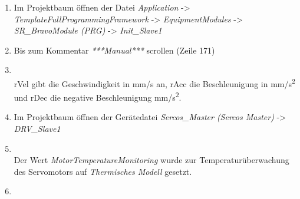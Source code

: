 \documentclass[../../../Bachelorarbeit.tex]{subfiles}
\begin{document}
\begin{enumerate}
    \item Im Projektbaum öffnen der Datei \textit{Application} -> \textit{TemplateFullProgrammingFramework} -> \textit{EquipmentModules} -> \textit{SR\_BravoModule (PRG)} -> \textit{Init\_Slave1}
    \item Bis zum Kommentar \textit{***Manual***} scrollen (Zeile 171)
    \item \begin{minipage}[t]{\linewidth}
        \raggedright
        \label{fig:my-img34}
    \end{minipage}
    \bigskip \\
    rVel gibt die Geschwindigkeit in \si{mm/s} an, rAcc die Beschleunigung in \si{mm/s^2} und rDec die negative Beschleunigung \si{mm/s^2}.
    \item Im Projektbaum öffnen der Gerätedatei \textit{Sercos\_Master (Sercos Master)} -> \\ \textit{DRV\_Slave1}
    \item \begin{minipage}[t]{\linewidth}
        \raggedright
        \label{fig:my-img35}
    \end{minipage}
    \bigskip \\
    Der Wert \textit{MotorTemperatureMonitoring} wurde zur Temperaturüberwachung des Servomotors auf \textit{Thermisches Modell} gesetzt.
    \item \begin{minipage}[t]{\linewidth}

\end{minipage}
\end{enumerate}
\end{document}
